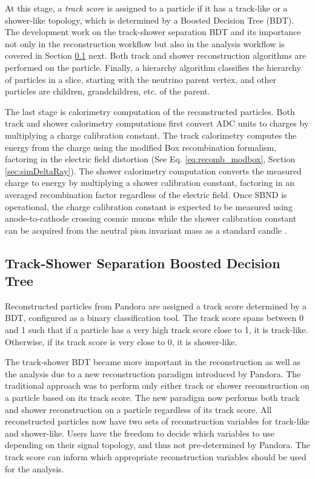 At this stage, a \textit{track score} is assigned to a particle if it has a track-like or a shower-like topology, which is determined by a Boosted Decision Tree (BDT).
The development work on the track-shower separation BDT and its importance not only in the reconstruction workflow but also in the analysis workflow is covered in Section \ref{sec:trkshwbdt} next.
Both track and shower reconstruction algorithms are performed on the particle. 
Finally, a hierarchy algorithm classifies the hierarchy of particles in a slice, starting with the neutrino parent vertex, and other particles are children, grandchildren, etc. of the parent.

The last stage is calorimetry computation of the reconstructed particles.
Both track and shower calorimetry computations first convert ADC units to charges by multiplying a charge calibration constant.
The track calorimetry computes the energy from the charge using the modified Box recombination formalism, factoring in the electric field distortion (See Eq. \ref{eq:recomb_modbox}, Section \ref{sec:simDeltaRay}).
The shower calorimetry computation converts the measured charge to energy by multiplying a shower calibration constant, factoring in an averaged recombination factor regardless of the electric field.
Once SBND is operational, the charge calibration constant is expected to be measured using anode-to-cathode crossing cosmic muons while the shower calibration constant can be acquired from the neutral pion invariant mass as a standard candle \cite{uboone_gamma}.

\subsection{Track-Shower Separation Boosted Decision Tree}
\label{sec:trkshwbdt}

Reconstructed particles from Pandora are assigned a track score determined by a BDT, configured as a binary classification tool.
The track score spans between 0 and 1 such that if a particle has a very high track score close to 1, it is track-like.
Otherwise, if its track score is very close to 0, it is shower-like.

The track-shower BDT became more important in the reconstruction as well as the analysis due to a new reconstruction paradigm introduced by Pandora.                                      
The traditional approach was to perform only either track or shower reconstruction on a particle based on its track score.
The new paradigm now performs both track and shower reconstruction on a particle regardless of its track score.
All reconstructed particles now have two sets of reconstruction variables for track-like and shower-like.
Users have the freedom to decide which variables to use depending on their signal topology, and thus not pre-determined by Pandora.
The track score can inform which appropriate reconstruction variables should be used for the analysis. 

